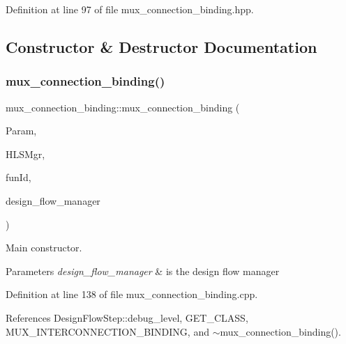 Definition at line 97 of file mux\+\_\+connection\+\_\+binding.\+hpp.



\subsection{Constructor \& Destructor Documentation}
\mbox{\label{classmux__connection__binding_a24be4eb50d6efd12ec88d90e6efd139d}} 
\subsubsection{\texorpdfstring{mux\+\_\+connection\+\_\+binding()}{mux\_connection\_binding()}}
{\footnotesize\ttfamily mux\+\_\+connection\+\_\+binding\+::mux\+\_\+connection\+\_\+binding (\begin{DoxyParamCaption}\item[{const \hyperlink{Parameter_8hpp_a37841774a6fcb479b597fdf8955eb4ea}{Parameter\+Const\+Ref}}]{Param,  }\item[{const \hyperlink{hls__manager_8hpp_acd3842b8589fe52c08fc0b2fcc813bfe}{H\+L\+S\+\_\+manager\+Ref}}]{H\+L\+S\+Mgr,  }\item[{unsigned int}]{fun\+Id,  }\item[{const Design\+Flow\+Manager\+Const\+Ref}]{design\+\_\+flow\+\_\+manager }\end{DoxyParamCaption})}



Main constructor. 


\begin{DoxyParams}{Parameters}
{\em design\+\_\+flow\+\_\+manager} & is the design flow manager \\
\hline
\end{DoxyParams}


Definition at line 138 of file mux\+\_\+connection\+\_\+binding.\+cpp.



References Design\+Flow\+Step\+::debug\+\_\+level, G\+E\+T\+\_\+\+C\+L\+A\+SS, M\+U\+X\+\_\+\+I\+N\+T\+E\+R\+C\+O\+N\+N\+E\+C\+T\+I\+O\+N\+\_\+\+B\+I\+N\+D\+I\+NG, and $\sim$mux\+\_\+connection\+\_\+binding().

